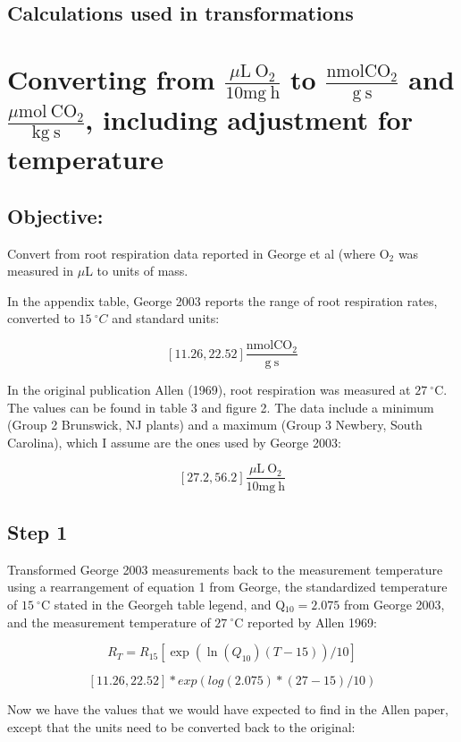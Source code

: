 \documentclass[12pt,english,portrait]{article}
\begin{document}
\subsection{Calculations used in transformations}

\section{Converting from $\frac{\mu\mathrm{L}\ \mathrm{O}_2}{10\mathrm{mg}\ \mathrm{h}}$ to  $\frac{\mathrm{nmol CO}_2}{\mathrm{g}\ \mathrm{s}}$ and $\frac{\mu\mathrm{mol}\ \mathrm{CO}_2}{\mathrm{kg}\ \mathrm{s}}$, including adjustment for temperature}
\label{app:rootrespcalc}

\subsection{Objective:} Convert from root respiration data reported in George et al (where O$_2$ was measured in $\mu$L to units of mass.

In the appendix table, George 2003 reports the range of root respiration rates, converted to $15\ ^\circ C$ and standard units:

$$[11.26, 22.52]  \frac{\mathrm{nmol CO}_2}{\mathrm{g}\ \mathrm{s}}$$


In the original publication Allen (1969), root respiration was measured at  $27\ ^\circ $C. 
The values can be found in table 3 and figure 2. 
The data include a minimum (Group 2 Brunswick, NJ plants) and a maximum (Group 3 Newbery, South Carolina), which I assume are the ones used by George 2003:

$$[27.2, 56.2] \frac{\mu\mathrm{L}\ \mathrm{O}_2}{10\mathrm{mg}\ \mathrm{h}}$$

\subsection{Step 1}
Transformed George 2003 measurements back to the measurement temperature using a rearrangement of equation 1 from George, the standardized temperature of  $15\ ^\circ $C stated in the Georgeh table legend, and  Q$_{10} = 2.075$ from George 2003, and the measurement temperature of $27\ ^\circ $C reported by Allen 1969: 

$$R_T = R_{15}[\exp(\ln(Q_{10})(T- 15))/10]$$

$$[11.26, 22.52] * exp(log(2.075)*(27 - 15)/10)$$

Now we have the values that we would have expected to find in the Allen paper, except that the units need to be converted back to the original:  
\end{document}
